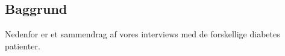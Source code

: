 \subsection{Baggrund}
Nedenfor er et sammendrag af vores interviews med de forskellige diabetes patienter.


%